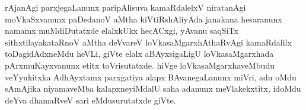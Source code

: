 rAjanAgi parxjegaLanunx paripAlisuva kamaRdalelxV niratanAgi moVkaSxvanunx paDedanoV aMtha kiVtiRshAliyAda janakana hesaranunx namamx muMdiDutatxde elalxkUkx hecACxgi, yAvanu saqSiTx sithxtilayakataRnoV aMtha deVvareV loVkasaMgarxhAthaRvAgi kamaRdalilx toDagidAdxneMdu heVLi, giVte elalx aBAyxsigaLigU loVkasaMgarxhada pArxmuKayxvanunx etitx toVrisutatxde. hiVge loVkasaMgarxhaveMbudu veYyukitxka AdhAyxtamx parxgatiya alapx BAvanegaLanunx miVri, adu oMdu sAmAjika niyamaveMba kalapxneyiMdalU saha adanunx meVlakekxtitx, idoMdu deYva dhamaRveV sari eMdusurutatxde giVte.

\theendnotes
